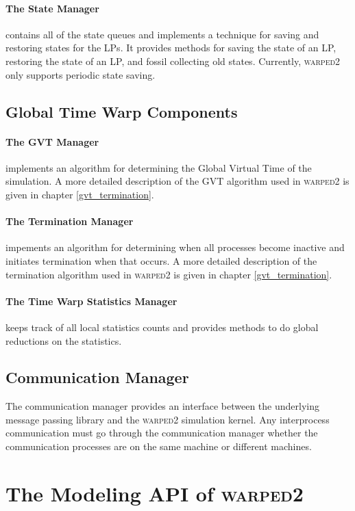 \documentclass[11pt]{book}
\begin{document}
\paragraph{The State Manager} contains all of the state queues and implements a technique
for saving and restoring states for the LPs. It provides methods for saving the state of an
LP, restoring the state of an LP, and fossil collecting old states. Currently, \textsc{warped2}
only supports periodic state saving.

\subsection{Global Time Warp Components}

\paragraph{The GVT Manager} implements an algorithm for determining the Global Virtual Time
of the simulation. A more detailed description of the GVT algorithm used in \textsc{warped2}
is given in chapter \ref{gvt_termination}.

\paragraph{The Termination Manager} impements an algorithm for determining when all processes
become inactive and initiates termination when that occurs. A more detailed description of
the termination algorithm used in \textsc{warped2} is given in chapter \ref{gvt_termination}.

\paragraph{The Time Warp Statistics Manager} keeps track of all local statistics counts and
provides methods to do global reductions on the statistics.

\subsection{Communication Manager}

The communication manager provides an interface between the underlying message passing library
and the \textsc{warped2} simulation kernel. Any interprocess communication must go through the
communication manager whether the communication processes are on the same machine or different
machines.

\section{The Modeling API of \textsc{warped2}}
\end{document}
